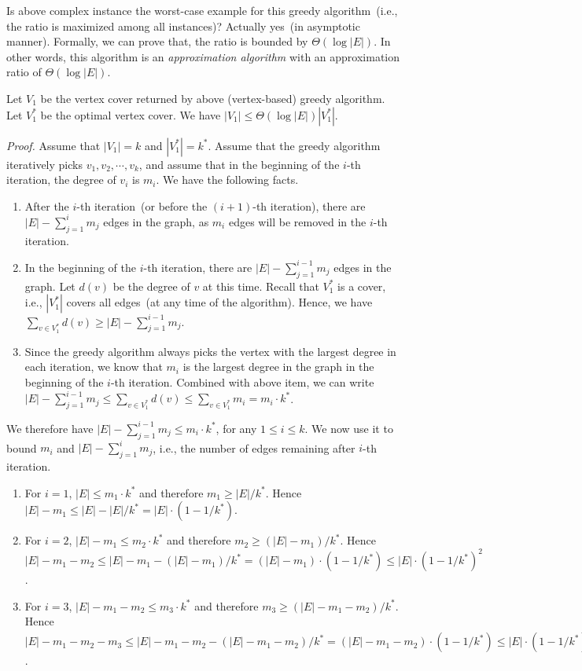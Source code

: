 Is above complex instance the worst-case example for this greedy algorithm~(i.e.,
the ratio is maximized among all instances)?
Actually yes~(in asymptotic manner).
Formally, we can prove that, the ratio is bounded by $\Theta(\log |E|)$. In
other words, this algorithm is an \emph{approximation algorithm} with an approximation
ratio of $\Theta(\log |E|)$.
\begin{fact}
Let $V_1$ be the vertex cover returned by above (vertex-based) greedy algorithm.
Let $V_1^*$ be the optimal vertex cover.
We have $|V_1| \le \Theta(\log |E|) |V_1^*|$.
\end{fact}
\emph{Proof.}
Assume that $|V_1| = k$ and $|V_1^*| = k^*$.
Assume that the greedy algorithm iteratively picks $v_1, v_2, \cdots, v_k$,
and assume that in the beginning of the $i$-th iteration, the degree of $v_i$ is $m_i$.  We have the following facts.
\vspace*{-\topsep}
\begin{enumerate}
\item After the $i$-th iteration~(or before the $(i+1)$-th iteration),
there are $|E| - \sum_{j=1}^i m_j$ edges in the graph,
as $m_i$ edges will be removed in the $i$-th iteration.
\item In the beginning of the $i$-th iteration,
there are $|E| - \sum_{j=1}^{i-1} m_j$ edges in the graph.
Let $d(v)$ be the degree of $v$ at this time. 
Recall that $V_1^*$ is a cover, i.e., $|V_1^*|$ covers all edges~(at any time of the algorithm). 
Hence, we have $\sum_{v\in V_1^*} d(v) \ge |E| - \sum_{j=1}^{i-1} m_j$.
\item Since the greedy algorithm always picks the vertex
with the largest degree in each iteration, we know that $m_i$ is the largest 
degree in the graph in the beginning of the $i$-th iteration.
Combined with above item, we can write $|E| - \sum_{j=1}^{i-1} m_j \le \sum_{v\in V_1^*} d(v) \le \sum_{v\in V_1^*} m_i = m_i \cdot k^*$.
\end{enumerate}

We therefore have $|E| - \sum_{j=1}^{i-1} m_j \le  m_i \cdot k^*$, for any $1\le i \le k$.
We now use it to bound $m_i$ and $|E| - \sum_{j=1}^{i} m_j$, i.e., the number of edges remaining after $i$-th iteration. 
\vspace*{-\topsep}
\begin{enumerate}
\item For $i = 1$, $|E| \le m_1 \cdot k^*$ and therefore $m_1 \ge |E| / k^*$.
Hence $|E| - m_1 \le |E| - |E|/k^* = |E| \cdot (1-1/k^*)$.

\item For $i = 2$, $|E| - m_1 \le m_2 \cdot k^*$ and therefore $m_2 \ge (|E| - m_1) / k^*$.
Hence $|E| - m_1 - m_2 \le |E| - m_1 - (|E| - m_1)/k^* = (|E| - m_1) \cdot (1-1/k^*) \le |E|\cdot(1-1/k^*)^2$.

\item For $i = 3$, $|E| - m_1 - m_2 \le m_3 \cdot k^*$ and therefore $m_3 \ge (|E| - m_1 - m_2) / k^*$.
Hence $|E| - m_1 - m_2 - m_3\le |E| - m_1 - m_2 - (|E| - m_1 - m_2)/k^* = (|E| - m_1 - m_2) \cdot (1-1/k^*) \le |E|\cdot(1-1/k^*)^3$.
\end{enumerate}

